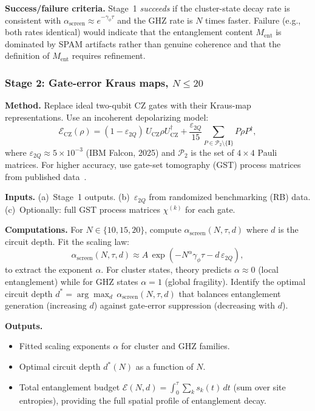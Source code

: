 \documentclass[12pt,letterpaper]{article}
\theoremstyle{plain}
\theoremstyle{definition}
\newcommand{\asc}{\alpha_{\mathrm{screen}}}
\begin{document}
\textbf{Success/failure criteria.}
Stage~1 \emph{succeeds} if the cluster-state decay rate is consistent with $\asc \approx e^{-\gamma_\phi\tau}$ and the GHZ rate is $N$ times faster.  Failure (e.g., both rates identical) would indicate that the entanglement content $M_{\mathrm{ent}}$ is dominated by SPAM artifacts rather than genuine coherence and that the definition of $M_{\mathrm{ent}}$ requires refinement.

\subsubsection*{Stage 2: Gate-error Kraus maps, $N \leq 20$}

\textbf{Method.}
Replace ideal two-qubit CZ gates with their Kraus-map representations.  Use an incoherent depolarizing model:
\begin{equation}
  \mathcal{E}_{\mathrm{CZ}}(\rho)
  = (1-\varepsilon_{2Q})\,U_{\mathrm{CZ}}\rho U_{\mathrm{CZ}}^\dagger
  + \frac{\varepsilon_{2Q}}{15}\sum_{P\in\mathcal{P}_2\setminus\{\mathbf{I}\}}
    P\rho P^\dagger,
  \label{eq:kraus}
\end{equation}
where $\varepsilon_{2Q} \approx 5\times10^{-3}$ (IBM Falcon, 2025) and $\mathcal{P}_2$ is the set of $4\times4$ Pauli matrices.  For higher accuracy, use gate-set tomography (GST) process matrices from published data~\cite{Blume2017}.

\textbf{Inputs.}
(a)~Stage~1 outputs.
(b)~$\varepsilon_{2Q}$ from randomized benchmarking (RB) data.
(c)~Optionally: full GST process matrices $\chi^{(k)}$ for each gate.

\textbf{Computations.}
For $N \in \{10, 15, 20\}$, compute $\asc(N,\tau,d)$ where $d$ is the circuit depth.  Fit the scaling law:
\begin{equation}
  \asc(N,\tau,d)
  \approx A\,\exp\!\left(-N^\alpha\gamma_\phi\tau - d\,\varepsilon_{2Q}\right),
  \label{eq:scaling-fit}
\end{equation}
to extract the exponent $\alpha$.  For cluster states, theory predicts $\alpha \approx 0$ (local entanglement) while for GHZ states $\alpha = 1$ (global fragility).  Identify the optimal circuit depth $d^* = \arg\max_d\,\asc(N,\tau,d)$ that balances entanglement generation (increasing $d$) against gate-error suppression (decreasing with $d$).

\textbf{Outputs.}
\begin{itemize}[noitemsep]
  \item Fitted scaling exponents $\alpha$ for cluster and GHZ families.
  \item Optimal circuit depth $d^*(N)$ as a function of $N$.
  \item Total entanglement budget $\mathcal{E}(N,d) = \int_0^\tau\sum_k s_k(t)\,dt$ (sum over site entropies), providing the full spatial profile of entanglement decay.
\end{itemize}
\end{document}
